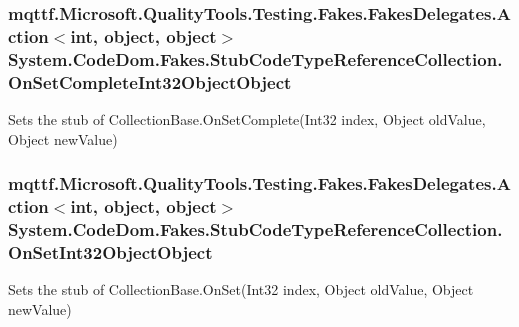 \hypertarget{class_system_1_1_code_dom_1_1_fakes_1_1_stub_code_type_reference_collection_a75a9f459af43fc0bf131ae97cfe042b9}{
\subsubsection[{On\-Set\-Complete\-Int32\-Object\-Object}]{\setlength{\rightskip}{0pt plus 5cm}mqttf.\-Microsoft.\-Quality\-Tools.\-Testing.\-Fakes.\-Fakes\-Delegates.\-Action$<$int, object, object$>$ System.\-Code\-Dom.\-Fakes.\-Stub\-Code\-Type\-Reference\-Collection.\-On\-Set\-Complete\-Int32\-Object\-Object}}\label{class_system_1_1_code_dom_1_1_fakes_1_1_stub_code_type_reference_collection_a75a9f459af43fc0bf131ae97cfe042b9}


Sets the stub of Collection\-Base.\-On\-Set\-Complete(\-Int32 index, Object old\-Value, Object new\-Value)

\hypertarget{class_system_1_1_code_dom_1_1_fakes_1_1_stub_code_type_reference_collection_a45e76f2e37cb1dfccbaccba6955803b9}{
\subsubsection[{On\-Set\-Int32\-Object\-Object}]{\setlength{\rightskip}{0pt plus 5cm}mqttf.\-Microsoft.\-Quality\-Tools.\-Testing.\-Fakes.\-Fakes\-Delegates.\-Action$<$int, object, object$>$ System.\-Code\-Dom.\-Fakes.\-Stub\-Code\-Type\-Reference\-Collection.\-On\-Set\-Int32\-Object\-Object}}\label{class_system_1_1_code_dom_1_1_fakes_1_1_stub_code_type_reference_collection_a45e76f2e37cb1dfccbaccba6955803b9}


Sets the stub of Collection\-Base.\-On\-Set(\-Int32 index, Object old\-Value, Object new\-Value)

